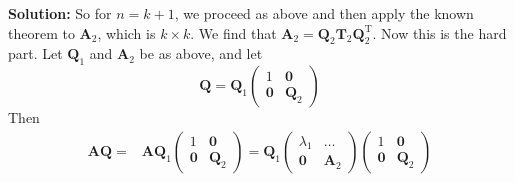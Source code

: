 \documentclass[14pt]{article}
\theoremstyle{definition}
\newenvironment{solution}
{\color{C2}\begin{framed}\begingroup\textbf{Solution:} }
  {\endgroup\end{framed}}
\theoremstyle{remark}
\begin{document}
\begin{solution}
    So for $n=k+1$, we proceed as above and then apply the known theorem to $\boldsymbol{A}_2$, which is $k \times k$. We find that $\boldsymbol{A}_2=\boldsymbol{Q}_2 \boldsymbol{T}_2 \boldsymbol{Q}_2^{\mathrm{T}}$. Now this is the hard part. Let $\boldsymbol{Q}_1$ and $\boldsymbol{A}_2$ be as above, and let
    $$
        \boldsymbol{Q}=\boldsymbol{Q}_1\left(\begin{array}{cc}
                1          & \mathbf{0}       \\
                \mathbf{0} & \boldsymbol{Q}_2
            \end{array}\right)
    $$
    Then
    $$
        \begin{aligned}
            \boldsymbol{A} \boldsymbol{Q}= & \boldsymbol{A} \boldsymbol{Q}_1\left(\begin{array}{cc}
                                                                                          1          & \mathbf{0}       \\
                                                                                          \mathbf{0} & \boldsymbol{Q}_2
                                                                                      \end{array}\right)=\boldsymbol{Q}_1\left(\begin{array}{cc}
                                                                                                                                   \lambda_1  & \ldots           \\
                                                                                                                                   \mathbf{0} & \boldsymbol{A}_2
                                                                                                                               \end{array}\right)\left(\begin{array}{cc}
                                                                                                                                                           1          & \mathbf{0}       \\
                                                                                                                                                           \mathbf{0} & \boldsymbol{Q}_2
                                                                                                                                                       \end{array}\right) \\

\end{aligned}$$
\end{solution}
\end{document}
